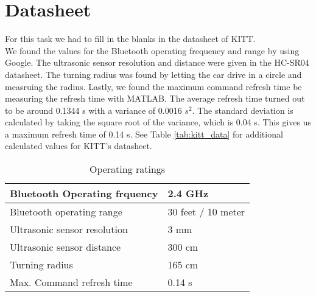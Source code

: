 \documentclass[final]{scrreprt} %
\begin{document}
\section{Datasheet}
For this task we had to fill in the blanks in the datasheet of KITT. \\
We found the values for the Bluetooth operating frequency and range by using Google. The ultrasonic sensor resolution and distance were given in the HC-SR04 datasheet. 
The turning radius was found by letting the car drive in a circle and measruing the radius. Lastly, we found the maximum command refresh time be measuring the refresh time with MATLAB. The average refresh time turned out to be around 0.1344 s with a variance of 0.0016 $s^2$. The standard deviation is calculated by taking the square root of the variance, which is 0.04 s.  This gives us a maximum refresh time of 0.14 s. See Table \ref{tab:kitt_data} for additional calculated values for KITT's datasheet.

\begin{table}[h]
\begin{center}
\begin{tabular}{ | l | l |}
    \hline
    Bluetooth Operating frquency & 2.4 GHz \\ \hline
    Bluetooth operating range & 30 feet / 10 meter \\\hline
    Ultrasonic sensor resolution    & 3 mm \\\hline
    Ultrasonic sensor distance	         & 300 cm \\\hline
    Turning radius & 165 cm \\\hline
    Max. Command refresh time & 0.14 s\\\hline
\end{tabular}
\caption{Operating ratings}
\end{center}
\end{table}
\label{tab:kitt_data}
\end{document}
